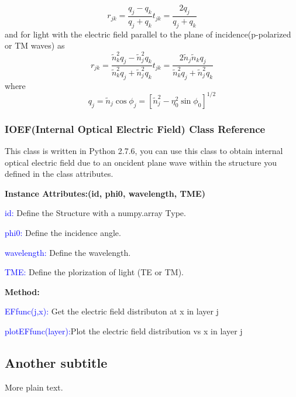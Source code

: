 \documentclass{article}
\begin{document}
\begin{subequations}
\begin{equation}
{{r}_{jk}}=\frac{{{q}_{j}}-{{q}_{k}}}{{{q}_{j}}+{{q}_{k}}}
\end{equation}
\begin{equation}
{{t}_{jk}}=\frac{2{{q}_{j}}}{{{q}_{j}}+{{q}_{k}}}
\end{equation}
\end{subequations}
and for light with the electric field parallel to the plane of
incidence(p-polarized or TM waves) as
\begin{subequations}
\begin{equation}
{{r}_{jk}}=\frac{\tilde{n}_{k}^{2}{{q}_{j}}-\tilde{n}_{j}^{2}{{q}_{k}}}{\tilde{n}_{k}^{2}{{q}_{j}}+\tilde{n}_{j}^{2}{{q}_{k}}}
\end{equation}
\begin{equation}
{{t}_{jk}}=\frac{2{{{\tilde{n}}}_{j}}{{{\tilde{n}}}_{k}}{{q}_{j}}}{\tilde{n}_{k}^{2}{{q}_{j}}+\tilde{n}_{j}^{2}{{q}_{k}}}
\end{equation}
\end{subequations}
where
\begin{equation}
{{q}_{j}}={{\tilde{n}}_{j}}\cos {{\phi }_{j}}={{[\tilde{n}_{j}^{2}-\eta
_{0}^{2}\sin {{\phi }_{0}}]}^{1/2}}
\end{equation}
\subsubsection{IOEF(Internal Optical Electric Field) Class Reference}
This class is written in Python 2.7.6, you can use this class to obtain internal
optical electric field due to an oncident plane wave
within the structure you defined in the class attributes.

\textbf{Instance Attributes:(id, phi0, wavelength, TME)}

\textcolor{blue}{id:} Define the Structure with a numpy.array Type.

\textcolor{blue}{phi0:} Define the incidence angle.

\textcolor{blue}{wavelength:} Define the wavelength.

\textcolor{blue}{TME:} Define the plorization of light (TE or TM).

\textbf{Method:}

\textcolor{blue}{EFfunc(j,x):} Get the electric field distributon at x in layer
j

\textcolor{blue}{plotEFfunc(layer):}Plot the electric field distribution vs x in
layer j










\subsection{Another subtitle}
More plain text.

{}

\end{document}
